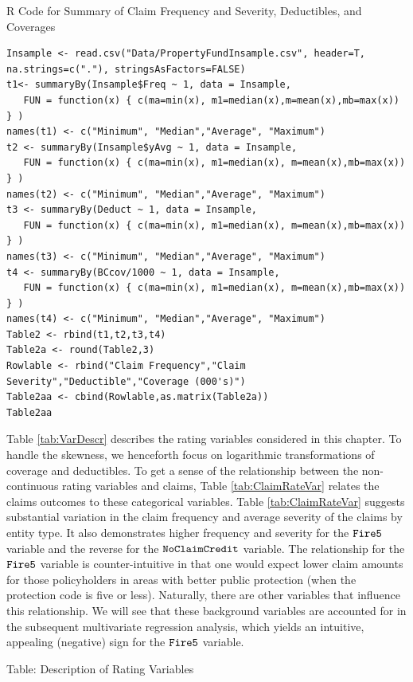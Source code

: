 \documentclass[]{book}
\begin{document}
R Code for Summary of Claim Frequency and Severity, Deductibles, and
Coverages

\hypertarget{display.DeductCov.2}{}
\begin{verbatim}
Insample <- read.csv("Data/PropertyFundInsample.csv", header=T, na.strings=c("."), stringsAsFactors=FALSE)
t1<- summaryBy(Insample$Freq ~ 1, data = Insample, 
   FUN = function(x) { c(ma=min(x), m1=median(x),m=mean(x),mb=max(x)) } )
names(t1) <- c("Minimum", "Median","Average", "Maximum")
t2 <- summaryBy(Insample$yAvg ~ 1, data = Insample, 
   FUN = function(x) { c(ma=min(x), m1=median(x), m=mean(x),mb=max(x)) } )
names(t2) <- c("Minimum", "Median","Average", "Maximum")
t3 <- summaryBy(Deduct ~ 1, data = Insample, 
   FUN = function(x) { c(ma=min(x), m1=median(x), m=mean(x),mb=max(x)) } )
names(t3) <- c("Minimum", "Median","Average", "Maximum")
t4 <- summaryBy(BCcov/1000 ~ 1, data = Insample, 
   FUN = function(x) { c(ma=min(x), m1=median(x), m=mean(x),mb=max(x)) } )
names(t4) <- c("Minimum", "Median","Average", "Maximum")
Table2 <- rbind(t1,t2,t3,t4)
Table2a <- round(Table2,3)
Rowlable <- rbind("Claim Frequency","Claim Severity","Deductible","Coverage (000's)")
Table2aa <- cbind(Rowlable,as.matrix(Table2a))
Table2aa
\end{verbatim}

Table \ref{tab:VarDescr} describes the rating variables considered in
this chapter. To handle the skewness, we henceforth focus on logarithmic
transformations of coverage and deductibles. To get a sense of the
relationship between the non-continuous rating variables and claims,
Table \ref{tab:ClaimRateVar} relates the claims outcomes to these
categorical variables. Table \ref{tab:ClaimRateVar} suggests substantial
variation in the claim frequency and average severity of the claims by
entity type. It also demonstrates higher frequency and severity for the
\({\tt Fire5}\) variable and the reverse for the \({\tt NoClaimCredit}\)
variable. The relationship for the \({\tt Fire5}\) variable is
counter-intuitive in that one would expect lower claim amounts for those
policyholders in areas with better public protection (when the
protection code is five or less). Naturally, there are other variables
that influence this relationship. We will see that these background
variables are accounted for in the subsequent multivariate regression
analysis, which yields an intuitive, appealing (negative) sign for the
\({\tt Fire5}\) variable.

Table: \label{tab:VarDescr} Description of Rating Variables
\end{document}
